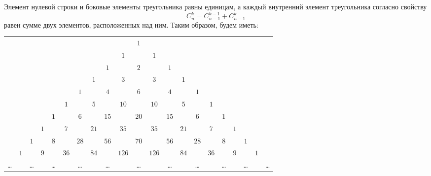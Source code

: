\documentclass[a5paper, 11pt]{extarticle}
\theoremstyle{definition}
\theoremstyle{definition}
\theoremstyle{definition}
\numberwithin{figure}{section}
\numberwithin{table}{section}
\begin{document}
Элемент нулевой строки и боковые элементы треугольника равны единицам, а каждый внутренний элемент треугольника согласно свойству
\[
    C_n^k = C_{n - 1}^{k - 1} + C_{n - 1}^k
\]
равен сумме двух элементов, расположенных над ним. Таким образом, будем иметь:

{
\setlength{\tabcolsep}{3pt}
\begin{longtable}{ccccccccccccccccccccc}
           &       &        &       &        &        &        &        &        &         & \(1\)  &         &        &        &        &        &        &       &        &       &        \\
           &       &        &       &        &        &        &        &        & \(1\)   &        & \(1\)   &        &        &        &        &        &       &        &       &        \\
           &       &        &       &        &        &        &        & \(1\)  &         & \(2\)  &         & \(1\)  &        &        &        &        &       &        &       &        \\
           &       &        &       &        &        &        & \(1\)  &        & \(3\)   &        & \(3\)   &        & \(1\)  &        &        &        &       &        &       &        \\
           &       &        &       &        &        & \(1\)  &        & \(4\)  &         & \(6\)  &         & \(4\)  &        & \(1\)  &        &        &       &        &       &        \\
           &       &        &       &        & \(1\)  &        & \(5\)  &        & \(10\)  &        & \(10\)  &        & \(5\)  &        & \(1\)  &        &       &        &       &        \\
           &       &        &       & \(1\)  &        & \(6\)  &        & \(15\) &         & \(20\) &         & \(15\) &        & \(6\)  &        & \(1\)  &       &        &       &        \\
           &       &        & \(1\) &        & \(7\)  &        & \(21\) &        & \(35\)  &        & \(35\)  &        & \(21\) &        & \(7\)  &        & \(1\) &        &       &        \\
           &       & \(1\)  &       & \(8\)  &        & \(28\) &        & \(56\) &         & \(70\) &         & \(56\) &        & \(28\) &        & \(8\)  &       & \(1\)  &       &        \\
           & \(1\) &        & \(9\) &        & \(36\) &        & \(84\) &        & \(126\) &        & \(126\) &        & \(84\) &        & \(36\) &        & \(9\) &        & \(1\) &        \\
    \ldots &       & \ldots &       & \ldots &        & \ldots &        & \ldots &         & \ldots &         & \ldots &        & \ldots &        & \ldots &       & \ldots &       & \ldots \\
\end{longtable}
}
\end{document}
